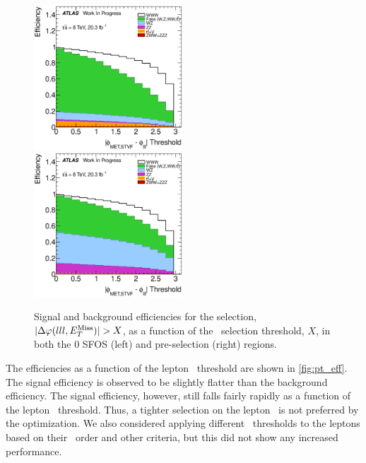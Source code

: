 \begin{figure}[ht!]
\centering
\includegraphics[width=0.495\textwidth]{figures/optimization/SignalRegionsPreselection_0SFOS_Efficiencies/DeltaPhiMETSTVF123_Abs_Cumulative.eps}
\includegraphics[width=0.495\textwidth]{figures/optimization/SignalRegions_0p5mmZ0_Preselection_Efficiencies/DeltaPhiMETSTVF123_Abs_Cumulative.eps}
\caption{ Signal and background efficiencies 
for the selection,
$|\Delta\varphi(lll,E_{T}^{\textrm{Miss}})| > X$,
as a function of the \deltaphi~selection
threshold, $X$, in both the 0 SFOS (left) and pre-selection (right) regions.  }
\label{fig:deltaphi_eff}
\end{figure}

The efficiencies as a function of the lepton \pt~threshold are shown 
in \fig\ref{fig:pt_eff}. 
The signal efficiency is observed to be slightly flatter
than the background efficiency.
The signal efficiency, however,  still falls fairly 
rapidly as a function of the lepton \pt~threshold. 
Thus, a tighter selection on the lepton \pt~is not preferred
by the optimization. We also considered 
applying different \pt~thresholds to the leptons
based on their \pt~order and other criteria, but
this did not show any increased performance.


